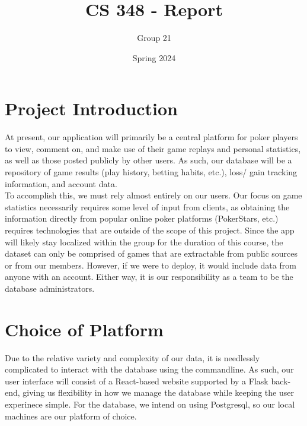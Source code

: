\documentclass{article}
\title{CS 348 - Report}
\author{Group 21}
\date{Spring 2024}
\begin{document}
\maketitle

\section{Project Introduction}


At present, our application will primarily be a central platform for poker players to view, comment on, and make use of their game replays and personal statistics,
as well as those posted publicly by other users. As such, our database will be a repository of game results (play history, betting habits, etc.), loss/ gain
tracking information, and account data. \\

\noindent To accomplish this, we must rely almost entirely on our users. Our focus on game statistics necessarily requires some level of input from clients, 
as obtaining the information directly from popular online poker platforms (PokerStars, etc.) requires technologies that are outside of the scope of this project. 
Since the app will likely stay localized within the group for the duration of this course, the dataset can only be comprised of games that are extractable from public sources
or from our members. However, if we were to deploy, it would include data from anyone with an account. 
Either way, it is our responsibility as a team to be the database administrators.

\section{Choice of Platform}


Due to the relative variety and complexity of our data, it is needlessly complicated to interact with the database using the commandline.
As such, our user interface will consist of a React-based website supported by a Flask back-end, giving us flexibility in how we manage the database 
while keeping the user experinece simple. For the database, we intend on using Postgresql, so our local machines are our platform of choice.
\end{document}
